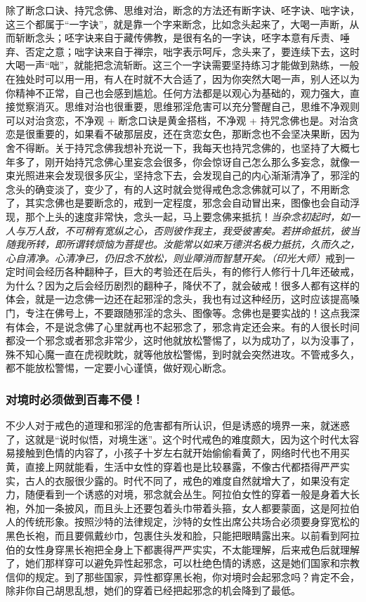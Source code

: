 除了断念口诀、持咒念佛、思维对治，断念的方法还有断字诀、呸字诀、咄字诀，这三个都属于“一字诀”，就是靠一个字来断念，比如念头起来了，大喝一声断，从而斩断念头；呸字诀来自于藏传佛教，是很有名的一字诀，呸字本意有斥责、唾弃、否定之意；咄字诀来自于禅宗，咄字表示呵斥，念头来了，要连续下去，这时大喝一声“咄”，就能把念流斩断。这三个一字诀需要坚持练习才能做到熟练，一般在独处时可以用一用，有人在时就不大合适了，因为你突然大喝一声，别人还以为你精神不正常，自己也会感到尴尬。任何方法都是以观心为基础的，观力强大，直接觉察消灭。思维对治也很重要，思维邪淫危害可以充分警醒自己，思维不净观则可以对治贪恋，不净观 + 断念口诀是黄金搭档，不净观 + 持咒念佛也是。对治贪恋是很重要的，如果看不破那层皮，还在贪恋女色，那断念也不会坚决果断，因为舍不得断。关于持咒念佛我想补充说一下，我每天也持咒念佛的，也坚持了大概七年多了，刚开始持咒念佛心里妄念会很多，你会惊讶自己怎么那么多妄念，就像一束光照进来会发现很多灰尘，坚持念下去，会发现自己的内心渐渐清净了，邪淫的念头的确变淡了，变少了，有的人这时就会觉得戒色念念佛就可以了，不用断念了，其实念佛也是要断念的，戒到一定程度，邪念会自动冒出来，图像也会自动浮现，那个上头的速度非常快，念头一起，马上要念佛来抵抗！\textit{当杂念初起时，如一人与万人敌，不可稍有宽纵之心，否则彼作我主，我受彼害矣。若拼命抵抗，彼当随我所转，即所谓转烦恼为菩提也。汝能常以如来万德洪名极力抵抗，久而久之，心自清净。心清净已，仍旧念不放松，则业障消而智慧开矣。（印光大师）}戒到一定时间会经历各种翻种子，巨大的考验还在后头，有的修行人修行十几年还破戒，为什么？因为之后会经历剧烈的翻种子，降伏不了，就会破戒！很多人都有这样的体会，就是一边念佛一边还在起邪淫的念头，我也有过这种经历，这时应该提高嗓门，专注在佛号上，不要跟随邪淫的念头、图像等。念佛也是要实战的！这点我深有体会，不是说念佛了心里就再也不起邪念了，邪念肯定还会来。有的人很长时间都没一个邪念或者邪念非常少，这时他就放松警惕了，以为成功了，以为没事了，殊不知心魔一直在虎视眈眈，就等他放松警惕，到时就会突然进攻。不管戒多久，都不能放松警惕，一定要小心谨慎，做好观心断念。

\subsubsection{对境时必须做到百毒不侵！}

不少人对于戒色的道理和邪淫的危害都有所认识，但是诱惑的境界一来，就迷惑了，这就是“说时似悟，对境生迷”。这个时代戒色的难度颇大，因为这个时代太容易接触到色情的内容了，小孩子十岁左右就开始偷偷看黄了，网络时代也不用买黄，直接上网就能看，生活中女性的穿着也是比较暴露，不像古代都捂得严严实实，古人的衣服很少露的。时代不同了，戒色的难度自然就增大了，如果没有定力，随便看到一个诱惑的对境，邪念就会丛生。阿拉伯女性的穿着一般是身着大长袍，外加一条披风，而且头上还要包着头巾带着头箍，女人都要蒙面，这是阿拉伯人的传统形象。按照沙特的法律规定，沙特的女性出席公共场合必须要身穿宽松的黑色长袍，而且要佩戴纱巾，包裹住头发和脸，只能把眼睛露出来。以前看到阿拉伯的女性身穿黑长袍把全身上下都裹得严严实实，不太能理解，后来戒色后就理解了，她们那样穿可以避免异性起邪念，可以杜绝色情的诱惑，这是她们国家和宗教信仰的规定。到了那些国家，异性都穿黑长袍，你对境时会起邪念吗？肯定不会，除非你自己胡思乱想，她们的穿着已经把起邪念的机会降到了最低。

